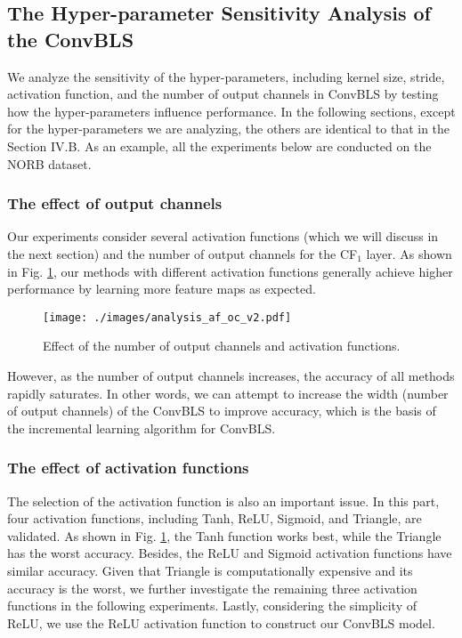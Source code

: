 \documentclass[lettersize,journal]{IEEEtran}
\begin{document}
\subsection{The Hyper-parameter Sensitivity Analysis of the ConvBLS}
We analyze the sensitivity of the hyper-parameters, including kernel size, stride, activation function, and the number of output channels in ConvBLS by testing how the hyper-parameters influence performance. In the following sections, except for the hyper-parameters we are analyzing, the others are identical to that in the Section IV.B.
As an example, all the experiments below are conducted on the NORB dataset.

\subsubsection{The effect of output channels}
Our experiments consider several activation functions (which we will discuss in the next section) and the number of output channels for the CF$_1$ layer. As shown in Fig. \ref{fig:analysis:af_oc}, our methods with different activation functions generally achieve higher performance by learning more feature maps as expected.
\begin{figure}[!t]
\centering
\texttt{[image: ./images/analysis\_af\_oc\_v2.pdf]}
\caption{Effect of the number of output channels and activation functions.}
\label{fig:analysis:af_oc}
\end{figure}
However, as the number of output channels increases, the accuracy of all methods rapidly saturates. In other words, we can attempt to increase the width (number of output channels) of the ConvBLS  to improve accuracy, which is the basis of the incremental learning algorithm for ConvBLS. 

\subsubsection{The effect of activation functions}
The selection of the activation function is also an important issue. In this part, four activation functions, including Tanh, ReLU, Sigmoid, and Triangle, are validated.
As shown in Fig. \ref{fig:analysis:af_oc}, the Tanh function works best, while the Triangle has the worst accuracy. Besides, the ReLU and Sigmoid activation functions have similar accuracy. Given that Triangle is computationally expensive and its accuracy is the worst, we further investigate the remaining three activation functions in the following experiments.  
Lastly, considering the simplicity of ReLU, we use the ReLU activation function to construct our ConvBLS model.
\end{document}
